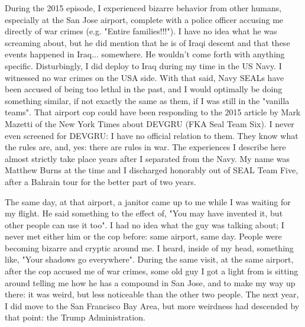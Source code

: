 \documentclass{article}
\begin{document}
\begin{multicols}{2}
During the 2015 episode, I experienced bizarre behavior from other humans, especially at the San Jose airport, complete with a police officer accusing me directly of war crimes (e.g. "Entire families!!!"). I have no idea what he was screaming about, but he did mention that he is of Iraqi descent and that these events happened in Iraq... somewhere. He wouldn't come forth with anything specific. Disturbingly, I did deploy to Iraq during my time in the US Navy. I witnessed no war crimes on the USA side. With that said, Navy SEALs have been accused of being too lethal in the past, and I would optimally be doing something similar, if not exactly the same as them, if I was still in the "vanilla teams". That airport cop could have been responding to the 2015 article by Mark Mazetti of the New York Times about DEVGRU (FKA Seal Team Six). I never even screened for DEVGRU: I have no official relation to them. They know what the rules are, and, yes: there are rules in war. The experiences I describe here almost strictly take place years after I separated from the Navy. My name was Matthew Burns at the time and I discharged honorably out of SEAL Team Five, after a Bahrain tour for the better part of two years. 

The same day, at that airport, a janitor came up to me while I was waiting for my flight. He said something to the effect of, "You may have invented it, but other people can use it too". I had no idea what the guy was talking about; I never met either him or the cop before: same airport, same day. People were becoming bizarre and cryptic around me. I heard, inside of my head, something like, "Your shadows go everywhere". During the same visit, at the same airport, after the cop accused me of war crimes, some old guy I got a light from is sitting around telling me how he has a compound in San Jose, and to make my way up there: it was weird, but less noticeable than the other two people. The next year, I did move to the San Francisco Bay Area, but more weirdness had descended by that point: the Trump Administration. 


\end{multicols}
\end{document}
